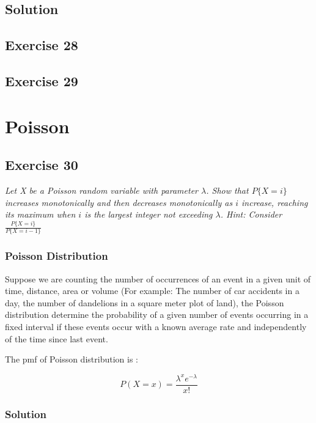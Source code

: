 \documentclass[12pt,a4paper]{article}
\begin{document}
\subsection{Solution}
 

\subsection{Exercise 28}

\subsection{Exercise 29}

\section{Poisson}

\subsection{Exercise 30}

\textit{Let X be a Poisson random variable with parameter $\lambda$. Show that $P\{X = i\}$ increases monotonically and then decreases monotonically as $i$ increase, reaching its maximum when $i$ is the largest integer not exceeding $\lambda$. Hint: Consider $\frac{P\{X = i\}}{P\{X = i-1\}}$}

\subsubsection{Poisson Distribution}

Suppose we are counting the number of occurrences of an event in a given unit of time, distance, area or volume (For example: The number of car accidents in a day, the number of dandelions in a square meter plot of land), the Poisson distribution determine the probability of a given number of events occurring in a fixed interval if these events occur with a known average rate and independently of the time since last event.

The pmf of Poisson distribution is :

\[
P(X = x) = \frac{\lambda^{x} e^{-\lambda}}{x!}
\]


\subsubsection{Solution}
\end{document}
